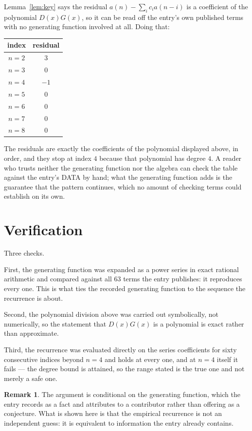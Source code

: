 \documentclass[11pt,a4paper]{article}
\theoremstyle{plain}
\theoremstyle{definition}
\newtheorem{remark}[theorem]{Remark}
\begin{document}
Lemma~\ref{lem:key} says the residual $a(n)-\sum_ic_ia(n-i)$ is a coefficient of the
polynomial $D(x)G(x)$, so it can be read off the entry's own published terms with no
generating function involved at all. Doing that:
\begin{center}
\begin{tabular}{cc}
index & residual \\ \hline
$n=2$ & $3$ \\
$n=3$ & $0$ \\
$n=4$ & $-1$ \\
$n=5$ & $0$ \\
$n=6$ & $0$ \\
$n=7$ & $0$ \\
$n=8$ & $0$
\end{tabular}
\end{center}
The residuals are exactly the coefficients of the polynomial displayed above, in order, and
they stop at index $4$ because that polynomial has degree $4$. A reader who trusts
neither the generating function nor the algebra can check the table against the entry's DATA
by hand; what the generating function adds is the guarantee that the pattern continues, which
no amount of checking terms could establish on its own.

\section{Verification}

Three checks.

First, the generating function was expanded as a power series in exact rational arithmetic and
compared against all $63$ terms the entry publishes: it reproduces every one. This is
what ties the recorded generating function to the sequence the recurrence is about.

Second, the polynomial division above was carried out symbolically, not numerically, so the
statement that $D(x)G(x)$ is a polynomial is exact rather than approximate.

Third, the recurrence was evaluated directly on the series coefficients for sixty consecutive
indices beyond $n=4$ and holds at every one, and at $n=4$ itself it fails --- the
degree bound is attained, so the range stated is the true one and not merely a safe one.

\begin{remark}
The argument is conditional on the generating function, which the entry records as a fact and
attributes to a contributor rather than offering as a conjecture. What is shown here is that
the empirical recurrence is not an independent guess: it is equivalent to information the
entry already contains.
\end{remark}
\end{document}
